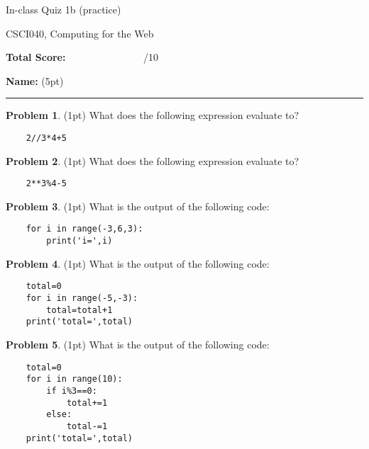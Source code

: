 \documentclass[10pt]{article}
\theoremstyle{definition}
\newtheorem{problem}{Problem}
\begin{document}
\begin{center}
    {
\Large
In-class Quiz 1b (practice)
}

    \vspace{0.1in}
CSCI040, Computing for the Web

    \vspace{0.1in}
\end{center}

\vspace{0.25in}
\noindent
\textbf{Total Score:} ~~~~~~~~~~~~~~~/10

\vspace{0.5in}
\noindent
\textbf{Name:} (5pt)

\noindent
\rule{\textwidth}{0.1pt}
\vspace{0.25in}

\begin{problem}
    (1pt)
    What does the following expression evaluate to?
\end{problem}
\begin{lstlisting}
    2//3*4+5
\end{lstlisting}
\vspace{1.5in}

\begin{problem}
    (1pt)
    What does the following expression evaluate to?
\end{problem}
\begin{lstlisting}
    2**3%4-5
\end{lstlisting}
\vspace{1.5in}

\begin{problem}
    (1pt)
    What is the output of the following code:
\end{problem}
\begin{lstlisting}
    for i in range(-3,6,3):
        print('i=',i)
\end{lstlisting}
\vspace{2in}

\begin{problem}
    (1pt)
    What is the output of the following code:
\end{problem}
\begin{lstlisting}
    total=0
    for i in range(-5,-3):
        total=total+1
    print('total=',total)
\end{lstlisting}
\vspace{2in}

\begin{problem}
    (1pt)
    What is the output of the following code:
\end{problem}
\begin{lstlisting}
    total=0
    for i in range(10):
        if i%3==0:
            total+=1
        else:
            total-=1
    print('total=',total)
\end{lstlisting}
\end{document}
